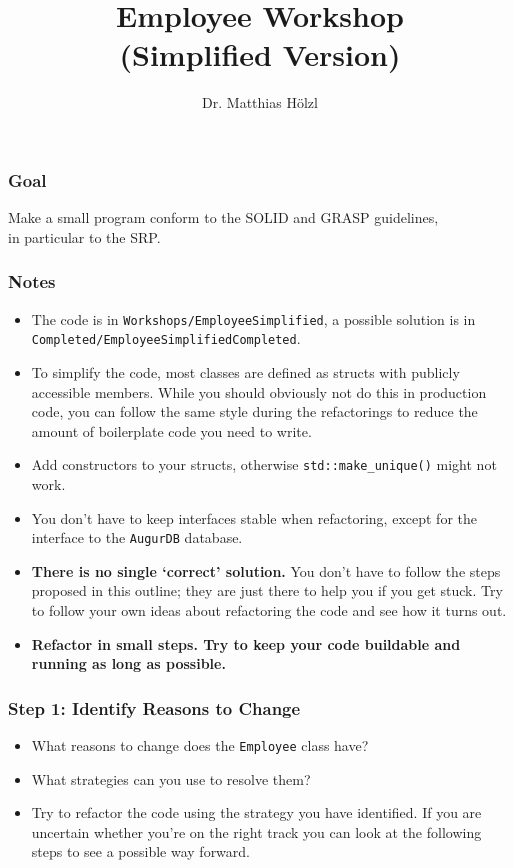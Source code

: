 \documentclass[10pt,aspectratio=169]{beamer}
\author{Dr. Matthias Hölzl}
\begin{document}
\title[Stack]{%
  Employee Workshop\\
  (Simplified Version)}

\begin{frame}
  \maketitle
\end{frame}

\begin{frame}[fragile]
  \frametitle{Goal}
  \Large Make a small program conform to the SOLID and GRASP guidelines,\\[1ex]
  in particular to the SRP.
\end{frame}

\begin{frame}[fragile]
  \frametitle{Notes}
  \begin{itemize}
    \item The code is in \verb|Workshops/EmployeeSimplified|, a possible
      solution is in \verb|Completed/EmployeeSimplifiedCompleted|.
    \item To simplify the code, most classes are defined as structs with
      publicly accessible members. While you should obviously not do this in
      production code, you can follow the same style during the refactorings to
      reduce the amount of boilerplate code you need to write.
    \item Add constructors to your structs, otherwise \verb|std::make_unique()|
      might not work.
    \item You don't have to keep interfaces stable when refactoring, except for
      the interface to the \verb|AugurDB| database.
    \item \textbf{There is no single `correct' solution.} You don't have to
      follow the steps proposed in this outline; they are just there to help you
      if you get stuck. Try to follow your own ideas about refactoring the code
      and see how it turns out.
    \item \textbf{Refactor in small steps. Try to keep your code buildable and
      running as long as possible.}
  \end{itemize}
\end{frame}

\begin{frame}[fragile]
  \frametitle{Step 1: Identify Reasons to Change}
  \begin{itemize}
    \item What reasons to change does the \verb|Employee| class have?
    \item What strategies can you use to resolve them?
    \item Try to refactor the code using the strategy you have identified. If
      you are uncertain whether you're on the right track you can look at the
      following steps to see a possible way forward.
  
  \end{itemize}
\end{frame}
\end{document}
